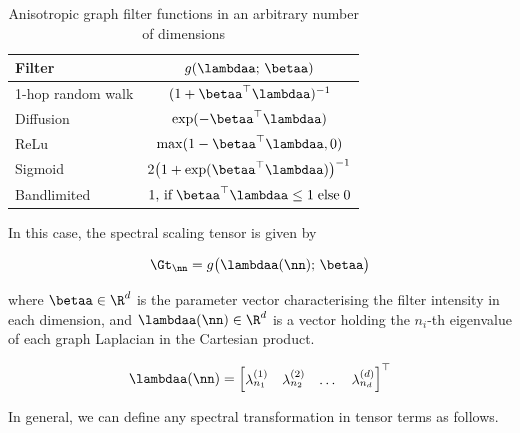 \begin{table}[t]
    \def\arraystretch{1.7}
    \small
    \begin{center}
        \begin{tabular}{|l|c|}
            \hline
            \textbf{Filter}   & $g(\lambdaa; \,\betaa)$                                            \\
            \hline
            1-hop random walk & $(1 + \betaa^\top\lambdaa)^{-1}$                                   \\
            \hline
            Diffusion         & $\exp(-\betaa^\top\lambdaa)$                                       \\
            \hline
            ReLu              & $\max (1 - \betaa^\top\lambdaa, 0)$                                \\
            \hline
            Sigmoid           & $2 \big( 1 + \exp(\betaa^\top\lambdaa)\big)^{-1}$                  \\
            \hline
            Bandlimited       & $1, \,\text{if} \; \betaa^\top\lambdaa \leq 1 \; \text{else} \; 0$ \\
            \hline
        \end{tabular}
    \end{center}
    \caption{Anisotropic graph filter functions in an arbitrary number of dimensions}
    \label{tab:anis_filters}
\end{table}


In this case, the spectral scaling tensor is given by 

\begin{equation}
    \label{eq:Gn_dd2}
    \Gt_{\nn} = g\big(\lambdaa(\nn); \, \betaa\big)
\end{equation}

where $\betaa \in \R^{d}$ is the parameter vector characterising the filter intensity in each dimension, and $\lambdaa(\nn) \in \R^d$ is a vector holding the $n_i$-th eigenvalue of each graph Laplacian in the Cartesian product. 

\begin{equation}
    \label{eq:lam_of_n}
\lambdaa(\nn) = 
\begin{bmatrix}
    \lambda^{(1)}_{n_1} & \lambda^{(2)}_{n_2} & \dots & \lambda^{(d)}_{n_d}    
\end{bmatrix}^\top
\end{equation}

In general, we can define any spectral transformation in tensor terms as follows. 

